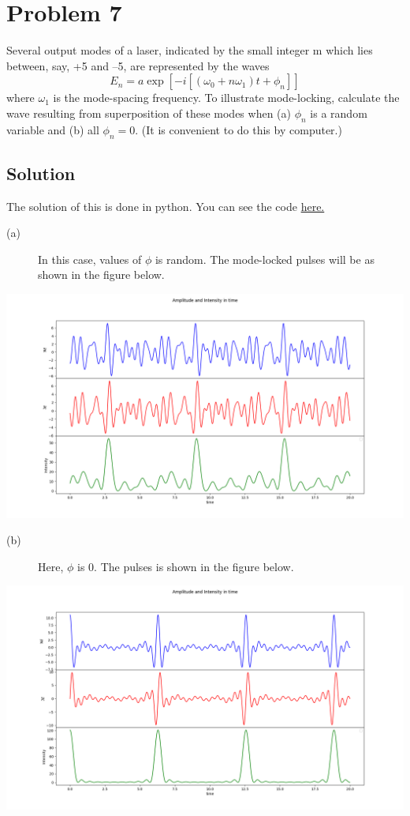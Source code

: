 \documentclass[a4paper,11pt]{article}
\begin{document}
\newpage
\section*{Problem 7}
\label{sec:org0023f6f}
Several output modes of a laser, indicated by the small integer m which lies between, say, +5 and –5, are represented by the waves 
\begin{equation}
E_n=a\exp\left[-i[(\omega_0+n\omega_1)t+\phi_n]\right]
\end{equation}
where \(\omega_1\) is the mode-spacing frequency. To illustrate mode-locking, calculate the wave resulting from superposition of these modes when (a) \(\phi_n\) is a random variable and (b) all \(\phi_n = 0\). (It is convenient to do this by computer.) 
\subsection*{Solution}
\label{sec:orgb90a08b}
The solution of this is done in python. You can see the code \href{https://github.com/varghesereji/Coursework\_assignments/blob/main/CQO/Ass\_2/Problem\_7\_answer\_code.py}{here.}
\begin{description}
\item[{(a)}] In this case, values of \(\phi\) is random.  The mode-locked pulses will be as shown in the figure below.
\end{description}
\begin{center}
\includegraphics[width=.9\linewidth]{pr_7_a.png}
\end{center}
\begin{description}
\item[{(b)}] Here, \(\phi\) is 0. The pulses is shown in the figure below.
\end{description}
\begin{center}
\includegraphics[width=.9\linewidth]{pr_7_b.png}
\end{center}
\end{document}
